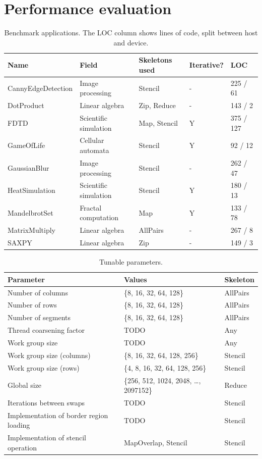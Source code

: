 \newpage
\section*{Performance evaluation}

\begin{table}
\footnotesize
\centering
\begin{tabular}{| l | l | l | l | l |}
\hline
\textbf{Name} & \textbf{Field} & \textbf{Skeletons used} & \textbf{Iterative?} & \textbf{LOC}\\
\hline
CannyEdgeDetection & Image processing & Stencil & - & 225 / 61\\
DotProduct & Linear algebra & Zip, Reduce & - & 143 / 2\\
FDTD & Scientific simulation & Map, Stencil & Y & 375 / 127\\
GameOfLife & Cellular automata & Stencil & Y & 92 / 12\\
GaussianBlur & Image processing & Stencil & - & 262 / 47\\
HeatSimulation & Scientific simulation & Stencil & Y & 180 / 13\\
MandelbrotSet & Fractal computation & Map & Y & 133 / 78\\
MatrixMultiply & Linear algebra & AllPairs & - & 267 / 8\\
SAXPY & Linear algebra & Zip & - & 149 / 3\\
\hline
\end{tabular}
\caption{Benchmark applications. The LOC column shows lines of code, split between host and device.}
\end{table}


\begin{table}
\footnotesize
\centering
\begin{tabular}{| l | l | l |}
\hline
\textbf{Parameter} & \textbf{Values} & \textbf{Skeleton}\\
\hline
Number of columns & \{8, 16, 32, 64, 128\} & AllPairs\\
Number of rows & \{8, 16, 32, 64, 128\} & AllPairs\\
Number of segments & \{8, 16, 32, 64, 128\} & AllPairs\\
Thread coarsening factor & TODO & Any\\
Work group size & TODO & Any\\
Work group size (columns) & \{8, 16, 32, 64, 128, 256\} & Stencil\\
Work group size (rows) & \{4, 8, 16, 32, 64, 128, 256\} & Stencil\\
Global size & \{256, 512, 1024, 2048, \ldots, 2097152\} & Reduce\\
Iterations between swaps & TODO & Stencil\\
Implementation of border region loading & TODO & Stencil\\
Implementation of stencil operation & {MapOverlap, Stencil} & Stencil\\
\hline
\end{tabular}
\caption{Tunable parameters.}
\end{table}

